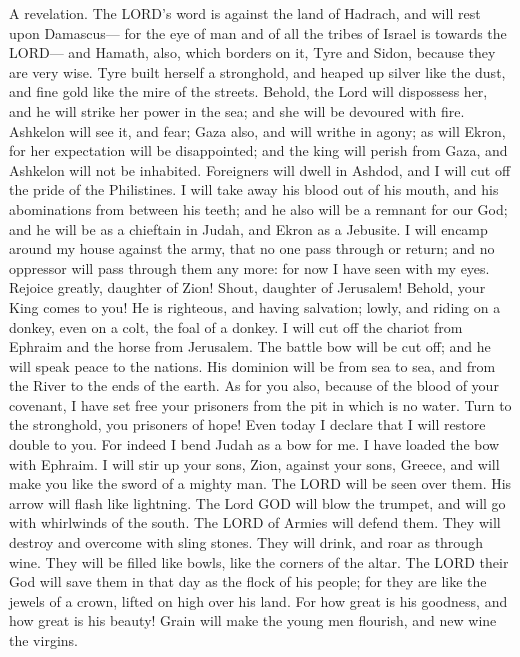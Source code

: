  A revelation. The LORD's word is against the land of
Hadrach, and will rest upon Damascus--- for the eye of man and of all
the tribes of Israel is towards the LORD---  and Hamath,
also, which borders on it, Tyre and Sidon, because they are very wise.
 Tyre built herself a stronghold, and heaped up silver
like the dust, and fine gold like the mire of the streets.
 Behold, the Lord will dispossess her, and he will strike
her power in the sea; and she will be devoured with fire. 
Ashkelon will see it, and fear; Gaza also, and will writhe in agony; as
will Ekron, for her expectation will be disappointed; and the king will
perish from Gaza, and Ashkelon will not be inhabited. 
Foreigners will dwell in Ashdod, and I will cut off the pride of the
Philistines.  I will take away his blood out of his mouth,
and his abominations from between his teeth; and he also will be a
remnant for our God; and he will be as a chieftain in Judah, and Ekron
as a Jebusite.  I will encamp around my house against the
army, that no one pass through or return; and no oppressor will pass
through them any more: for now I have seen with my eyes. 
Rejoice greatly, daughter of Zion! Shout, daughter of Jerusalem! Behold,
your King comes to you! He is righteous, and having salvation; lowly,
and riding on a donkey, even on a colt, the foal of a donkey.
 I will cut off the chariot from Ephraim and the horse
from Jerusalem. The battle bow will be cut off; and he will speak peace
to the nations. His dominion will be from sea to sea, and from the River
to the ends of the earth.  As for you also, because of
the blood of your covenant, I have set free your prisoners from the pit
in which is no water.  Turn to the stronghold, you
prisoners of hope! Even today I declare that I will restore double to
you.  For indeed I bend Judah as a bow for me. I have
loaded the bow with Ephraim. I will stir up your sons, Zion, against
your sons, Greece, and will make you like the sword of a mighty man.
 The LORD will be seen over them. His arrow will flash
like lightning. The Lord GOD will blow the trumpet, and will go with
whirlwinds of the south.  The LORD of Armies will defend
them. They will destroy and overcome with sling stones. They will drink,
and roar as through wine. They will be filled like bowls, like the
corners of the altar.  The LORD their God will save them
in that day as the flock of his people; for they are like the jewels of
a crown, lifted on high over his land.  For how great is
his goodness, and how great is his beauty! Grain will make the young men
flourish, and new wine the virgins.

